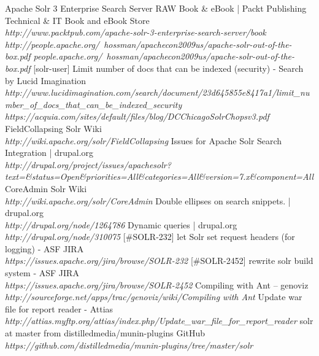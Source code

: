\begin{thebibliography}{99}
		Apache Solr 3 Enterprise Search Server RAW Book \& eBook | Packt Publishing Technical \& IT Book and eBook Store\\
		\emph{http://www.packtpub.com/apache-solr-3-enterprise-search-server/book}
		\emph{http://people.apache.org/~hossman/apachecon2009us/apache-solr-out-of-the-box.pdf people.apache.org/~hossman/apachecon2009us/apache-solr-out-of-the-box.pdf}
		[solr-user] Limit number of docs that can be indexed (security) - Search by Lucid Imagination\\
		\emph{http://www.lucidimagination.com/search/document/23d645855e8417a1/limit\_number\_of\_docs\_that\_can\_be\_indexed\_security}
		\emph{https://acquia.com/sites/default/files/blog/DC\-Chicago\-Solr\-Chops\-v3.pdf}
	 	FieldCollapsing \- Solr Wiki\\
		\emph{http://wiki.apache.org/solr/FieldCollapsing}
		Issues for Apache Solr Search Integration | drupal.org\\
		\emph{http://drupal.org/project/issues/apachesolr?text=\&status=Open\&priorities=All\&categories=All\&version=7.x\&component=All}
		CoreAdmin \- Solr Wiki\\
		\emph{http://wiki.apache.org/solr/CoreAdmin}
		Double ellipses on search snippets. | drupal.org\\
		\emph{http://drupal.org/node/1264786}
		Dynamic queries | drupal.org\\
		\emph{http://drupal.org/node/310075}
		[\#SOLR-232] let Solr set request headers (for logging) - ASF JIRA\\
		\emph{https://issues.apache.org/jira/browse/SOLR-232}
	 	[\#SOLR-2452] rewrite solr build system - ASF JIRA\\
		\emph{https://issues.apache.org/jira/browse/SOLR-2452}
		Compiling with Ant – genoviz\\
		\emph{http://sourceforge.net/apps/trac/genoviz/wiki/Compiling with Ant}
		Update war file for report reader - Attias\\
		\emph{http://attias.myftp.org/attias/index.php/Update\_war\_file\_for\_report\_reader}
		solr at master from distilledmedia/munin-plugins \- GitHub\\
		\emph{https://github.com/distilledmedia/munin-plugins/tree/master/solr}

\end{thebibliography}
